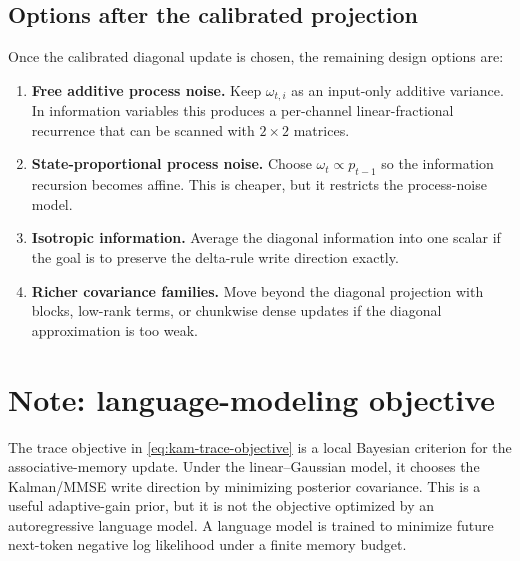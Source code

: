 \documentclass[11pt]{article}
\begin{document}
\subsection*{Options after the calibrated projection}

Once the calibrated diagonal update is chosen, the remaining design options are:
\begin{enumerate}[leftmargin=1.6em,itemsep=3pt]
  \item \textbf{Free additive process noise.} Keep $\omega_{t,i}$ as an input-only additive
  variance. In information variables this produces a per-channel linear-fractional
  recurrence that can be scanned with $2\times2$ matrices.

  \item \textbf{State-proportional process noise.} Choose $\omega_t\propto p_{t-1}$ so the
  information recursion becomes affine. This is cheaper, but it restricts the process-noise
  model.

  \item \textbf{Isotropic information.} Average the diagonal information into one scalar if the
  goal is to preserve the delta-rule write direction exactly.

  \item \textbf{Richer covariance families.} Move beyond the diagonal projection with blocks,
  low-rank terms, or chunkwise dense updates if the diagonal approximation is too weak.
\end{enumerate}

\section*{Note: language-modeling objective}

The trace objective in \eqref{eq:kam-trace-objective} is a local Bayesian criterion for the
associative-memory update. Under the linear--Gaussian model, it chooses the Kalman/MMSE write
direction by minimizing posterior covariance. This is a useful adaptive-gain prior, but it is
not the objective optimized by an autoregressive language model. A language model is trained
to minimize future next-token negative log likelihood under a finite memory budget.
\end{document}
